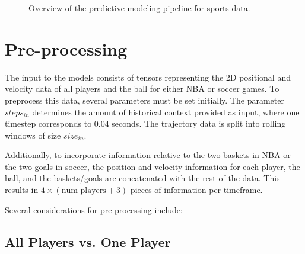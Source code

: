 \begin{figure}[t]
    \centering
{}
    \caption{Overview of the predictive modeling pipeline for sports data.}
    \label{fig:pipeline}
\end{figure}

\section{Pre-processing}
\label{sec:preprocessing}
The input to the models consists of tensors representing the 2D positional and velocity data of all players and the ball for either NBA or soccer games. To preprocess this data, several parameters must be set initially. The parameter \(steps_{in}\) determines the amount of historical context provided as input, where one timestep corresponds to 0.04 seconds. The trajectory data is split into rolling windows of size \(size_{in}\).

Additionally, to incorporate information relative to the two baskets in NBA or the two goals in soccer, the position and velocity information for each player, the ball, and the baskets/goals are concatenated with the rest of the data. This results in \(4 \times (\text{num\_players} + 3)\) pieces of information per timeframe.

Several considerations for pre-processing include:

\subsection{All Players vs. One Player}

